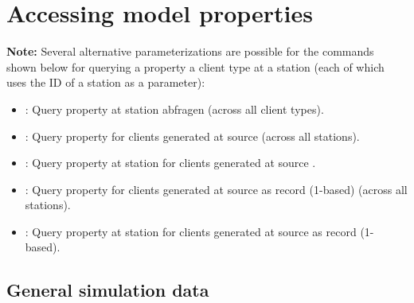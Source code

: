 \chapter{Accessing model properties}



\textbf{Note:}
Several alternative parameterizations are possible for the commands shown below for querying a property a client type at a station (each of which uses the ID of a station as a parameter):

\begin{itemize}
\item
{}: Query property at station  abfragen (across all client types).
\item
{}: Query property for clients generated at source  (across all stations).
\item
{}: Query property at station  for clients generated at source .
\item
{}: Query property for clients generated at source  as record  (1-based) (across all stations).
\item
{}: Query property at station  for clients generated at source  as record  (1-based).
\end{itemize}



\section{General simulation data}

